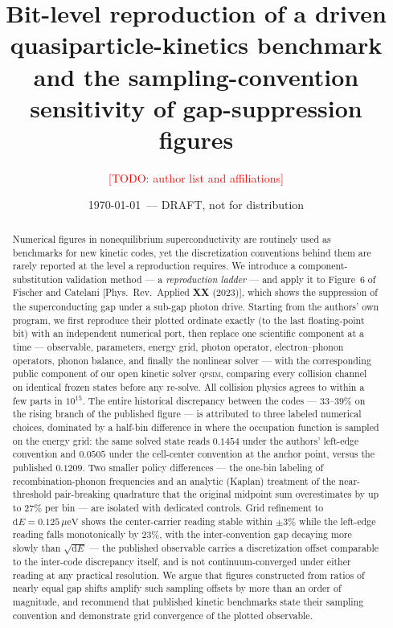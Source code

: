 \documentclass[reprint,amsmath,amssymb,aps,prapplied,nofootinbib]{revtex4-2}
\newcommand{\todo}[1]{\textcolor{red}{[TODO: #1]}}
\newcommand{\qpsim}{\textsc{qpsim}}
\newcommand{\ueV}{\,\mu\mathrm{eV}}
\begin{document}
\title{Bit-level reproduction of a driven quasiparticle-kinetics benchmark
and the sampling-convention sensitivity of gap-suppression figures}

\author{\todo{author list and affiliations}}

\date{\today\ --- DRAFT, not for distribution}

\begin{abstract}
Numerical figures in nonequilibrium superconductivity are routinely used
as benchmarks for new kinetic codes, yet the discretization conventions
behind them are rarely reported at the level a reproduction requires.  We
introduce a component-substitution validation method --- a
\emph{reproduction ladder} --- and apply it to Figure~6 of Fischer and
Catelani [Phys.\ Rev.\ Applied \textbf{XX} (2023)], which shows the
suppression of the superconducting gap under a sub-gap photon drive.
Starting from the authors' own program, we first reproduce their plotted
ordinate exactly (to the last floating-point bit) with an independent
numerical port, then replace one scientific component at a time ---
observable, parameters, energy grid, photon operator, electron--phonon
operators, phonon balance, and finally the nonlinear solver --- with the
corresponding public component of our open kinetic solver \qpsim{},
comparing every collision channel on identical frozen states before any
re-solve.  All collision physics agrees to within a few parts in
$10^{15}$.  The entire historical discrepancy between the codes ---
$33\text{--}39\%$ on the rising branch of the published figure --- is
attributed to three labeled numerical choices, dominated by a half-bin
difference in where the occupation function is sampled on the energy
grid: the same solved state reads $0.1454$ under the authors' left-edge
convention and $0.0505$ under the cell-center convention at the anchor
point, versus the published $0.1209$.  Two smaller policy differences ---
the one-bin labeling of recombination-phonon frequencies and an analytic
(Kaplan) treatment of the near-threshold pair-breaking quadrature that
the original midpoint sum overestimates by up to $27\%$ per bin --- are
isolated with dedicated controls.  Grid refinement to $\mathrm{d}E = 0.125\ueV$ shows the center-carrier
reading stable within $\pm 3\%$ while the left-edge reading falls
monotonically by $23\%$, with the inter-convention gap decaying more
slowly than $\sqrt{\mathrm{d}E}$ --- the published observable carries a
discretization offset comparable to the inter-code discrepancy itself,
and is not continuum-converged under either reading at any practical
resolution.  We argue that figures constructed
from ratios of nearly equal gap shifts amplify such sampling offsets by
more than an order of magnitude, and recommend that published kinetic
benchmarks state their sampling convention and demonstrate grid
convergence of the plotted observable.
\end{abstract}
\end{document}
